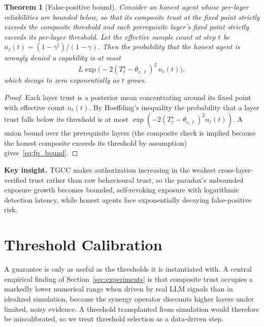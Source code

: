 \documentclass[sigconf,anonymous]{acmart}
\theoremstyle{plain}
\newtheorem{theorem}{Theorem}
\theoremstyle{definition}
\theoremstyle{remark}
\begin{document}
\begin{theorem}[False-positive bound]
\label{thm:fp}
Consider an honest agent whose per-layer reliabilities are bounded below, so that its
composite trust at the fixed point strictly exceeds the composite threshold and each
prerequisite layer's fixed point strictly exceeds its per-layer threshold. Let the
effective sample count at step $t$ be $n_\ell(t)=(1-\gamma^t)/(1-\gamma)$. Then the
probability that the honest agent is wrongly denied a capability is at most
\begin{equation}
L\exp\!\bigl(-2(T_\ell^\star-\theta_{c,\ell})^2\,n_\ell(t)\bigr),
\label{eq:fp_bound}
\end{equation}
which decays to zero exponentially as $t$ grows.
\end{theorem}
\begin{proof}
Each layer trust is a posterior mean concentrating around its fixed point with effective
count $n_\ell(t)$. By Hoeffding's inequality the probability that a layer trust falls below
its threshold is at most $\exp(-2(T_\ell^\star-\theta_{c,\ell})^2 n_\ell(t))$. A union bound
over the prerequisite layers (the composite check is implied because the honest composite
exceeds its threshold by assumption) gives~\eqref{eq:fp_bound}.
\end{proof}

\textbf{Key insight.} TGCC makes authorization increasing in the weakest
cross-layer-verified trust rather than raw behavioural trust, so the paradox's unbounded
exposure growth becomes bounded, self-revoking exposure with logarithmic detection
latency, while honest agents face exponentially decaying false-positive risk.

\section{Threshold Calibration}
\label{sec:calibration}
A guarantee is only as useful as the thresholds it is instantiated with. A central
empirical finding of Section~\ref{sec:experiments} is that composite trust occupies a
markedly lower numerical range when driven by real LLM signals than in idealized
simulation, because the synergy operator discounts higher layers under limited, noisy
evidence. A threshold transplanted from simulation would therefore be miscalibrated, so we
treat threshold selection as a data-driven step.
\end{document}
